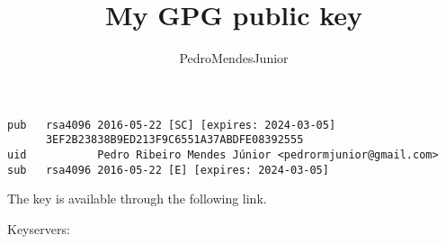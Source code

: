 

% 

\renewcommand\highlightauthorname[1]{#1}

\title{My GPG public key}
\author{\gls{PedroMendesJunior}\\%
}
\date{}



\maketitle

\begin{verbatim}
pub   rsa4096 2016-05-22 [SC] [expires: 2024-03-05]
      3EF2B23838B9ED213F9C6551A37ABDFE08392555
uid           Pedro Ribeiro Mendes Júnior <pedrormjunior@gmail.com>
sub   rsa4096 2016-05-22 [E] [expires: 2024-03-05]
\end{verbatim}

The key is available through the following link.

\begin{center}
\end{center}

Keyservers:

\\




